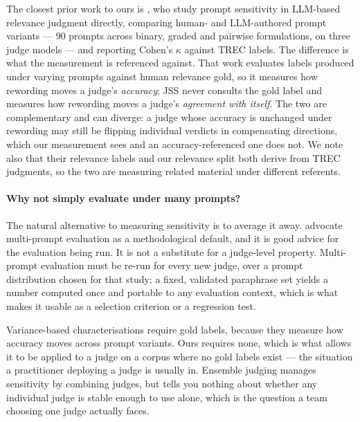 \documentclass[11pt]{article}          %
\begin{document}
The closest prior work to ours is \citet{arabzadeh2025human}, who study prompt
sensitivity in LLM-based relevance judgment directly, comparing human- and
LLM-authored prompt variants --- 90 prompts across binary, graded and pairwise
formulations, on three judge models --- and reporting Cohen's $\kappa$ against
TREC labels. The difference is what the measurement is referenced against. That
work evaluates labels produced under varying prompts against human relevance
gold, so it measures how rewording moves a judge's \emph{accuracy}; JSS never
consults the gold label and measures how rewording moves a judge's
\emph{agreement with itself}. The two are complementary and can diverge: a judge
whose accuracy is unchanged under rewording may still be flipping individual
verdicts in compensating directions, which our measurement sees and an
accuracy-referenced one does not. We note also that their relevance labels and
our relevance split both derive from TREC judgments, so the two are measuring
related material under different referents.

\paragraph{Why not simply evaluate under many prompts?}
The natural alternative to measuring sensitivity is to average it away.
\citet{mizrahi2024state} advocate multi-prompt evaluation as a methodological
default, and it is good advice for the evaluation being run. It is not a
substitute for a judge-level property. Multi-prompt evaluation must be re-run for
every new judge, over a prompt distribution chosen for that study; a fixed,
validated paraphrase set yields a number computed once and portable to any
evaluation context, which is what makes it usable as a selection criterion or a
regression test.

Variance-based characterisations \citep{sclar2024quantifying, zhuo2024prosa}
require gold labels, because they measure how accuracy moves across prompt
variants. Ours requires none, which is what allows it to be applied to a judge on
a corpus where no gold labels exist --- the situation a practitioner deploying a
judge is usually in. Ensemble judging \citep{li2024llms} manages sensitivity by
combining judges, but tells you nothing about whether any individual judge is
stable enough to use alone, which is the question a team choosing one judge
actually faces.
\end{document}
